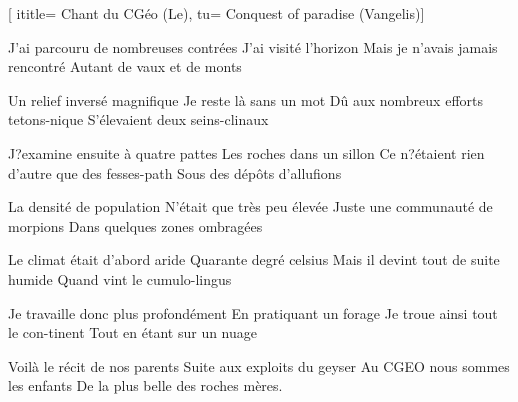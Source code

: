  [
ititle= {Chant du CGéo (Le)},
tu= {Conquest of paradise (Vangelis)}]

\beginverse
J'ai parcouru de nombreuses contrées
J'ai visité l'horizon
Mais je n'avais jamais rencontré
Autant de vaux et de monts
\endverse

\beginverse
Un relief inversé magnifique
Je reste là sans un mot
Dû aux nombreux efforts tetons-nique
S'élevaient deux seins-clinaux
\endverse

\beginverse
J?examine ensuite à quatre pattes
Les roches dans un sillon
Ce n?étaient rien d'autre que des fesses-path
Sous des dépôts d'allufions
\endverse

\beginverse
La densité de population
N'était que très peu élevée
Juste une communauté de morpions
Dans quelques zones ombragées
\endverse

\beginverse
Le climat était d'abord aride
Quarante degré celsius
Mais il devint tout de suite humide
Quand vint le cumulo-lingus
\endverse

\beginverse
Je travaille donc plus profondément
En pratiquant un forage
Je troue ainsi tout le con-tinent
Tout en étant sur un nuage
\endverse

\beginverse
Voilà le récit de nos parents
Suite aux exploits du geyser
Au CGEO nous sommes les enfants
De la plus belle des roches mères.
\endverse

\endsong
